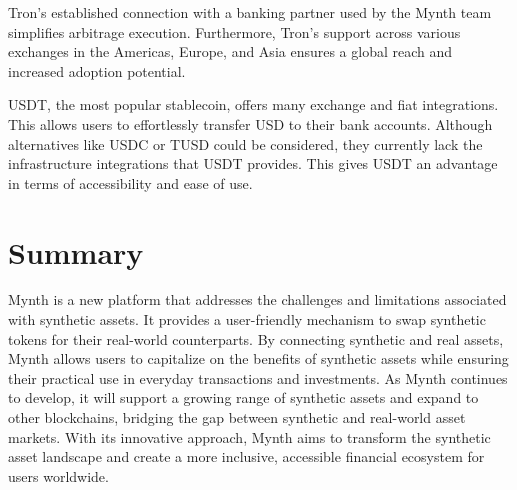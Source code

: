 Tron's established connection with a banking partner used by the Mynth
team simplifies arbitrage execution. Furthermore, Tron's support across
various exchanges in the Americas, Europe, and Asia ensures a global
reach and increased adoption potential.

USDT, the most popular stablecoin, offers many exchange and fiat
integrations. This allows users to effortlessly transfer USD to their
bank accounts. Although alternatives like USDC or TUSD could be
considered, they currently lack the infrastructure integrations that
USDT provides. This gives USDT an advantage in terms of accessibility
and ease of use.

\hypertarget{summary}{%
\section{Summary}\label{summary}}

Mynth is a new platform that addresses the challenges and limitations
associated with synthetic assets. It provides a user-friendly mechanism
to swap synthetic tokens for their real-world counterparts. By
connecting synthetic and real assets, Mynth allows users to capitalize
on the benefits of synthetic assets while ensuring their practical use
in everyday transactions and investments. As Mynth continues to develop,
it will support a growing range of synthetic assets and expand to other
blockchains, bridging the gap between synthetic and real-world asset
markets. With its innovative approach, Mynth aims to transform the
synthetic asset landscape and create a more inclusive, accessible
financial ecosystem for users worldwide.
